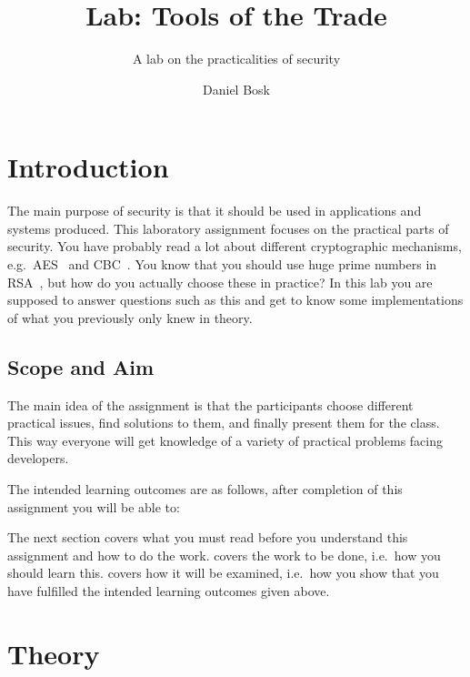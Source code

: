 \title{Lab: Tools of the Trade}
\subtitle{A lab on the practicalities of security}

\author{%
  Daniel Bosk
}

\maketitle

\section{Introduction}%
\label{sec:intro}
The main purpose of security is that it should be used in applications and 
systems produced.
This laboratory assignment focuses on the practical parts of security.
You have probably read a lot about different cryptographic mechanisms, 
e.g.~AES~\cite{aes} and CBC~\cite{blockmodes}.
You know that you should use huge prime numbers in RSA~\cite{rsa}, but how do 
you actually choose these in practice?
In this lab you are supposed to answer questions such as this and get to know 
some implementations of what you previously only knew in theory.

\subsection{Scope and Aim}%
\label{sec:aim}
The main idea of the assignment is that the participants choose different 
practical issues, find solutions to them, and finally present them for the 
class.
This way everyone will get knowledge of a variety of practical problems facing 
developers.

The intended learning outcomes are as follows, after completion of this 
assignment you will be able to:
\begin{itemize}
    
\end{itemize}

The next section covers what you must read before you understand this 
assignment and how to do the work.
 covers the work to be done, i.e.~how you should learn this.
 covers how it will be examined, i.e.~how you show that you have 
fulfilled the intended learning outcomes given above.


\section{Theory}%
\label{sec:theory}



